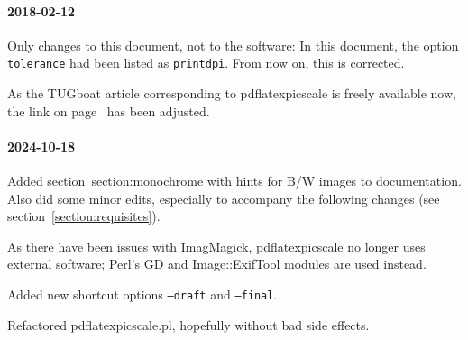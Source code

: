 \documentclass[10pt,a4paper]{article}
\begin{document}
\paragraph{2018-02-12} Only changes to this document, not to the software: In
this document, the option \texttt{tolerance} had been listed as
\texttt{printdpi}. From now on, this is corrected.

As the TUGboat article corresponding to pdflatexpicscale is freely available
now, the link on page~\pageref{tugboatart} has been adjusted.

\paragraph{2024-10-18}

Added section~{section:monochrome} with hints for B/W images to
documentation. Also did some minor edits, especially to accompany the
following changes (see section~\ref{section:requisites}). 

As there have been issues with ImagMagick, pdflatexpicscale no longer uses
external software; Perl's GD and Image::ExifTool modules are used instead. 

Added new shortcut options \texttt{--draft} and \texttt{--final}.

Refactored pdflatexpicscale.pl, hopefully without bad side effects.

\end{document}
